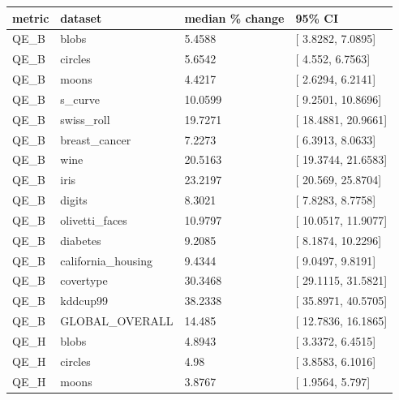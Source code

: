 \documentclass[
]{article}
\newcounter{none} %
\providecommand{\DIFadd}[1]{{\protect\color{blue} #1}} %
\providecommand{\DIFaddbegin}{} %
\begin{document}
\DIFaddbegin {\def\LTcaptype{none} %
\begin{longtable}[]{@{}llll@{}}
\toprule\noalign{}
\DIFadd{metric }& \DIFadd{dataset }& \DIFadd{median \% change }& \DIFadd{95\% CI }\\
\midrule\noalign{}
\endhead
\bottomrule\noalign{}
\endlastfoot
\DIFadd{QE\_B }& \DIFadd{blobs }& \DIFadd{5.4588 }& {[}\DIFadd{3.8282, 7.0895}{]} \\
\DIFadd{QE\_B }& \DIFadd{circles }& \DIFadd{5.6542 }& {[}\DIFadd{4.552, 6.7563}{]} \\
\DIFadd{QE\_B }& \DIFadd{moons }& \DIFadd{4.4217 }& {[}\DIFadd{2.6294, 6.2141}{]} \\
\DIFadd{QE\_B }& \DIFadd{s\_curve }& \DIFadd{10.0599 }& {[}\DIFadd{9.2501, 10.8696}{]} \\
\DIFadd{QE\_B }& \DIFadd{swiss\_roll }& \DIFadd{19.7271 }& {[}\DIFadd{18.4881, 20.9661}{]} \\
\DIFadd{QE\_B }& \DIFadd{breast\_cancer }& \DIFadd{7.2273 }& {[}\DIFadd{6.3913, 8.0633}{]} \\
\DIFadd{QE\_B }& \DIFadd{wine }& \DIFadd{20.5163 }& {[}\DIFadd{19.3744, 21.6583}{]} \\
\DIFadd{QE\_B }& \DIFadd{iris }& \DIFadd{23.2197 }& {[}\DIFadd{20.569, 25.8704}{]} \\
\DIFadd{QE\_B }& \DIFadd{digits }& \DIFadd{8.3021 }& {[}\DIFadd{7.8283, 8.7758}{]} \\
\DIFadd{QE\_B }& \DIFadd{olivetti\_faces }& \DIFadd{10.9797 }& {[}\DIFadd{10.0517, 11.9077}{]} \\
\DIFadd{QE\_B }& \DIFadd{diabetes }& \DIFadd{9.2085 }& {[}\DIFadd{8.1874, 10.2296}{]} \\
\DIFadd{QE\_B }& \DIFadd{california\_housing }& \DIFadd{9.4344 }& {[}\DIFadd{9.0497, 9.8191}{]} \\
\DIFadd{QE\_B }& \DIFadd{covertype }& \DIFadd{30.3468 }& {[}\DIFadd{29.1115, 31.5821}{]} \\
\DIFadd{QE\_B }& \DIFadd{kddcup99 }& \DIFadd{38.2338 }& {[}\DIFadd{35.8971, 40.5705}{]} \\
\DIFadd{QE\_B }& \DIFadd{GLOBAL\_OVERALL }& \DIFadd{14.485 }& {[}\DIFadd{12.7836, 16.1865}{]} \\
\DIFadd{QE\_H }& \DIFadd{blobs }& \DIFadd{4.8943 }& {[}\DIFadd{3.3372, 6.4515}{]} \\
\DIFadd{QE\_H }& \DIFadd{circles }& \DIFadd{4.98 }& {[}\DIFadd{3.8583, 6.1016}{]} \\
\DIFadd{QE\_H }& \DIFadd{moons }& \DIFadd{3.8767 }& {[}\DIFadd{1.9564, 5.797}{]} \\

\end{longtable}}
\end{document}
